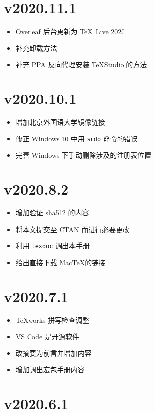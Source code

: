 \section*{v2020.11.1}

\begin{itemize}
  \item Overleaf 后台更新为 \TeX\ Live 2020
  \item 补充卸载方法
  \item 补充 PPA 反向代理安装 \TeX Studio 的方法
\end{itemize}

\section*{v2020.10.1}

\begin{itemize}
  \item 增加北京外国语大学镜像链接
  \item 修正 Windows 10 中用 \texttt{sudo} 命令的错误
  \item 完善 Windows 下手动删除涉及的注册表位置
\end{itemize}

\section*{v2020.8.2}

\begin{itemize}
  \item 增加验证 sha512 的内容
  \item 将本文提交至 CTAN 而进行必要更改
  \item 利用 \texttt{texdoc} 调出本手册
  \item 给出直接下载 Mac\TeX 的链接
\end{itemize}

\section*{v2020.7.1}

\begin{itemize}
  \item \TeX works 拼写检查调整
  \item VS Code 是开源软件
  \item 改摘要为前言并增加内容
  \item 增加调出宏包手册内容
\end{itemize}

\section*{v2020.6.1}

